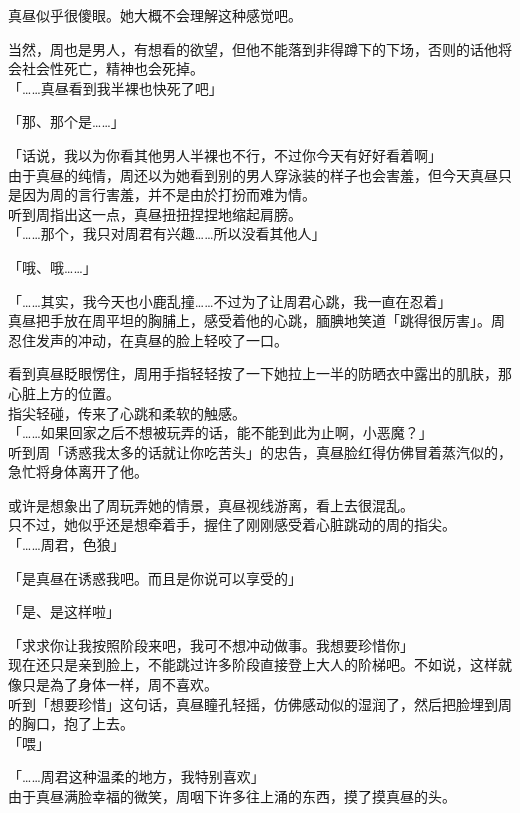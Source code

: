 真昼似乎很傻眼。她大概不会理解这种感觉吧。

当然，周也是男人，有想看的欲望，但他不能落到非得蹲下的下场，否则的话他将会社会性死亡，精神也会死掉。\\

「……真昼看到我半裸也快死了吧」

「那、那个是……」

「话说，我以为你看其他男人半裸也不行，不过你今天有好好看着啊」\\

由于真昼的纯情，周还以为她看到别的男人穿泳装的样子也会害羞，但今天真昼只是因为周的言行害羞，并不是由於打扮而难为情。\\

听到周指出这一点，真昼扭扭捏捏地缩起肩膀。\\

「……那个，我只对周君有兴趣……所以没看其他人」

「哦、哦……」

「……其实，我今天也小鹿乱撞……不过为了让周君心跳，我一直在忍着」\\

真昼把手放在周平坦的胸脯上，感受着他的心跳，腼腆地笑道「跳得很厉害」。周忍住发声的冲动，在真昼的脸上轻咬了一口。

看到真昼眨眼愣住，周用手指轻轻按了一下她拉上一半的防晒衣中露出的肌肤，那心脏上方的位置。\\

指尖轻碰，传来了心跳和柔软的触感。\\

「……如果回家之后不想被玩弄的话，能不能到此为止啊，小恶魔？」\\

听到周「诱惑我太多的话就让你吃苦头」的忠告，真昼脸红得仿佛冒着蒸汽似的，急忙将身体离开了他。

或许是想象出了周玩弄她的情景，真昼视线游离，看上去很混乱。\\

只不过，她似乎还是想牵着手，握住了刚刚感受着心脏跳动的周的指尖。\\

「……周君，色狼」

「是真昼在诱惑我吧。而且是你说可以享受的」

「是、是这样啦」

「求求你让我按照阶段来吧，我可不想冲动做事。我想要珍惜你」\\

现在还只是亲到脸上，不能跳过许多阶段直接登上大人的阶梯吧。不如说，这样就像只是為了身体一样，周不喜欢。\\

听到「想要珍惜」这句话，真昼瞳孔轻摇，仿佛感动似的湿润了，然后把脸埋到周的胸口，抱了上去。\\

「喂」

「……周君这种温柔的地方，我特别喜欢」\\

由于真昼满脸幸福的微笑，周咽下许多往上涌的东西，摸了摸真昼的头。
